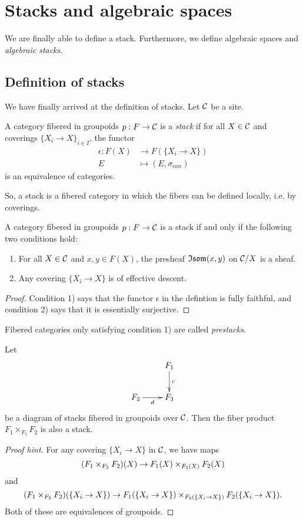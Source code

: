 \documentclass[11pt, english]{article}
\begin{document}
\pagebreak
\section{Stacks and algebraic spaces} 

We are finally able to define a stack. Furthermore, we define algebraic spaces and \emph{algebraic stacks}.

\subsection{Definition of stacks}

We have finally arrived at the definition of stacks. Let $\mathcal{C}$ be a site.

\begin{defi}
A category fibered in groupoids $p:F \to \mathcal{C}$ is a \emph{stack} if for all $X \in \mathcal{C}$ and coverings $\{ X_i \to X\}_{i \in I}$, the functor
\begin{align*}
\epsilon:F(X) &\to F(\{X_i \to X\}) \\
E &\mapsto (E, \sigma_{can})
\end{align*}
is an equivalence of categories.
\end{defi}

So, a stack is a fibered category in which the fibers can be defined locally, i.e. by coverings.

\begin{lemma}
A category fibered in groupoids $p:F \to \mathcal{C}$ is a stack if and only if the following two conditions hold:
\begin{enumerate}
\item For all $X \in \mathcal{C}$ and $x,y \in F(X)$, the presheaf $\mathfrak{Isom}(x,y)$ on $\mathcal{C}/X$ is a sheaf.
\item Any  covering $\{ X_i \to X\}$ is of effective descent.
\end{enumerate}
\end{lemma}
\begin{proof}
Condition 1) says that the functor $\epsilon$ in the defintion is fully faithful, and condition 2) says that it is essentially surjective.
\end{proof} 

Fibered categories only satisfying condition 1) are called \emph{prestacks}. 

\begin{lemma}
Let 
\[
\xymatrix{
 & F_1 \ar[d]^c \\
F_2 \ar[r]_d & F_3
}
\]
be a diagram of stacks fibered in groupoids over $\mathcal{C}$. Then the fiber product $F_1 \times_{F_3} F_2$ is also a stack.
\end{lemma}
\begin{proof}[Proof hint] 
For any covering $\{ X_i \to X\}$ in $\mathcal{C}$, we have maps
\[
(F_1 \times_{F_3} F_2)(X) \to F_1(X) \times_{F_3(X)} F_2(X)
\]
and
\[
(F_1 \times_{F_3} F_2)(\{X_i \to X\}) \to F_1(\{X_i \to X\}) \times_{F_3(\{X_i \to X\})} F_2(\{ X_i \to X\}).
\]
Both of these are equivalences of groupoids. 
\end{proof}
\end{document}
